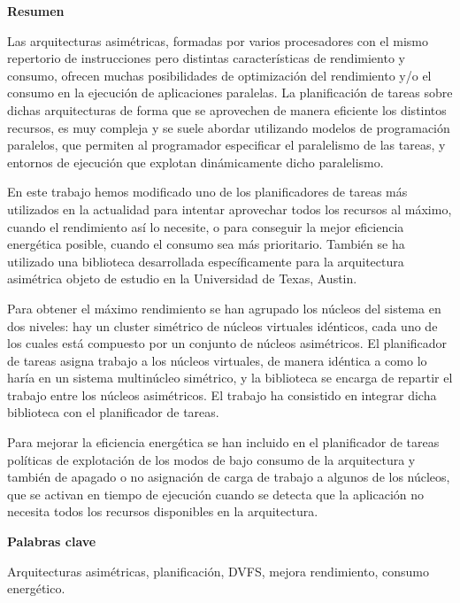 
\cleardoublepage
\thispagestyle{empty}

\begin{center}
  {\bf \Huge Resumen}
\end{center}

Las arquitecturas asimétricas, formadas por varios procesadores con el
mismo repertorio de instrucciones pero distintas características de
rendimiento y consumo, ofrecen muchas posibilidades de optimización del
rendimiento y/o el consumo en la ejecución de aplicaciones paralelas. La
planificación de tareas sobre dichas arquitecturas de forma que se
aprovechen de manera eficiente los distintos recursos, es muy compleja y se
suele abordar utilizando modelos de programación paralelos, que permiten al
programador especificar el paralelismo de las tareas, y entornos de
ejecución que explotan dinámicamente dicho paralelismo.

En este trabajo hemos modificado uno de los planificadores de tareas más
utilizados en la actualidad para intentar aprovechar todos los recursos al
máximo, cuando el rendimiento así lo necesite, o para conseguir la mejor
eficiencia energética posible, cuando el consumo sea más
prioritario. También se ha utilizado una biblioteca desarrollada
específicamente para la arquitectura asimétrica objeto de estudio en la
Universidad de Texas, Austin.

Para obtener el máximo rendimiento se han agrupado los núcleos del sistema
en dos niveles: hay un cluster simétrico de núcleos virtuales idénticos,
cada uno de los cuales está compuesto por un conjunto de núcleos
asimétricos. El planificador de tareas asigna trabajo a los núcleos
virtuales, de manera idéntica a como lo haría en un sistema multinúcleo
simétrico, y la biblioteca se encarga de repartir el trabajo entre los
núcleos asimétricos. El trabajo ha consistido en integrar dicha biblioteca
con el planificador de tareas.

Para mejorar la eficiencia energética se han incluido en el planificador de
tareas políticas de explotación de los modos de bajo consumo de la
arquitectura y también de apagado o no asignación de carga de trabajo a
algunos de los núcleos, que se activan en tiempo de ejecución cuando se
detecta que la aplicación no necesita todos los recursos disponibles en la
arquitectura.


\begin{center}
  {\bf \Large Palabras clave}
\end{center}
{
\parindent=0in   
Arquitecturas asimétricas, planificación, DVFS, mejora rendimiento, consumo
energético.
}




